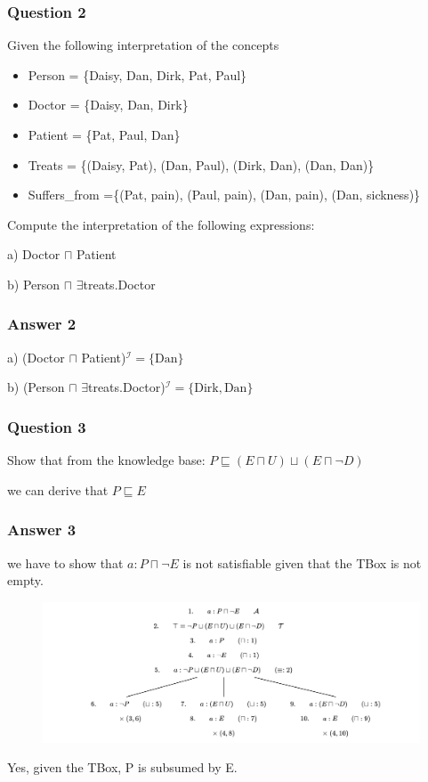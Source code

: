 \documentclass[runningheads]{llncs}
\begin{document}
\subsubsection{Question 2}
Given the following interpretation of the concepts
\begin{itemize}
    \item Person = \{Daisy, Dan, Dirk, Pat, Paul\}
    \item Doctor = \{Daisy, Dan, Dirk\}
    \item Patient = \{Pat, Paul, Dan\}
    \item Treats = \{(Daisy, Pat), (Dan, Paul), (Dirk, Dan), (Dan, Dan)\} 
    \item Suffers\_from =\{(Pat, pain), (Paul, pain), (Dan, pain), (Dan, sickness)\}
\end{itemize}

Compute the interpretation of the following expressions:

a) Doctor $\sqcap$ Patient 

b) Person $\sqcap$ $\exists$treats.Doctor

\subsubsection{Answer 2} \qquad


a) (Doctor $\sqcap$ Patient)$^\mathcal{I} = \{\text{Dan}\}$

b) (Person $\sqcap$ $\exists$treats.Doctor)$^\mathcal{I} = \{\text{Dirk}, \text{Dan}\}$


\subsubsection{Question 3}
Show that from the knowledge base: $P \sqsubseteq (E \sqcap U) \sqcup (E \sqcap \neg D)$

we can derive that $P \sqsubseteq E$

\subsubsection{Answer 3} 

we have to show that $a: P \sqcap \neg E$ is not satisfiable given that the TBox is not empty.

\begin{figure}
  \centering
  \includegraphics[width=0.8\linewidth]{tp.png}
\end{figure}

Yes, given the TBox, P is subsumed by E.
\end{document}
